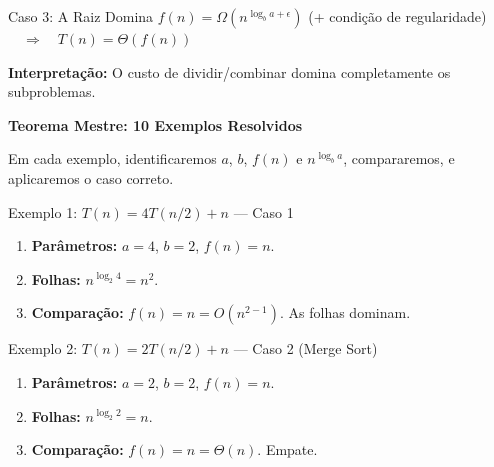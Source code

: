 \documentclass[aspectratio=169]{beamer}
\begin{document}
\begin{frame}[fragile]{Caso 3: A Raiz Domina}
    $f(n) = \Omega(n^{\log_b a + \epsilon})$ (+ condição de regularidade) $\quad \Rightarrow \quad T(n) = \Theta(f(n))$
    
    \vspace{0.2cm}
    \begin{center}
    \end{center}
    
    \textbf{Interpretação:} O custo de dividir/combinar domina completamente os subproblemas.
\end{frame}

\begin{frame}{}
    \begin{center}
        {\Large \textbf{Teorema Mestre: 10 Exemplos Resolvidos}}
        
        \vspace{0.3cm}
        Em cada exemplo, identificaremos $a$, $b$, $f(n)$ e $n^{\log_b a}$, compararemos, e aplicaremos o caso correto.
    \end{center}
\end{frame}

\begin{frame}{Exemplo 1: $T(n) = 4T(n/2) + n$ {\normalfont\small--- Caso 1}}
    \begin{enumerate}
        \item \textbf{Parâmetros:} $a = 4$, $b = 2$, $f(n) = n$.
        \item \textbf{Folhas:} $n^{\log_2 4} = n^2$.
        \item \textbf{Comparação:} $f(n) = n = O(n^{2 - 1})$. As folhas dominam.
    \end{enumerate}
    \hfill{}
\end{frame}

\begin{frame}{Exemplo 2: $T(n) = 2T(n/2) + n$ {\normalfont\small--- Caso 2 (Merge Sort)}}
    \begin{enumerate}
        \item \textbf{Parâmetros:} $a = 2$, $b = 2$, $f(n) = n$.
        \item \textbf{Folhas:} $n^{\log_2 2} = n$.
        \item \textbf{Comparação:} $f(n) = n = \Theta(n)$. Empate.
    \end{enumerate}
    \hfill{}
\end{frame}
\end{document}
